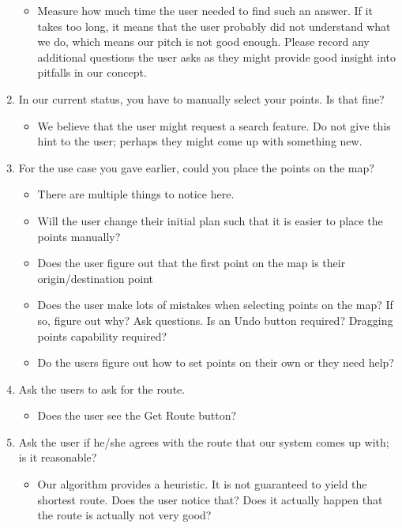 \documentclass[a4paper, 10pt]{report}
\begin{document}
\begin{appendices}
\begin{enumerate}
\begin{itemize}
\item Measure how much time the user needed to find such an answer. If it takes too long, it means that the user probably did not understand what we do, which means our pitch is not good enough. Please record any additional questions the user asks as they might provide good insight into pitfalls in our concept.
\end{itemize}
\item In our current status, you have to manually select your points. Is that fine?
\begin{itemize}
\item We believe that the user might request a search feature. Do not give this hint to the user; perhaps they might come up with something new.
\end{itemize}
\item For the use case you gave earlier, could you place the points on the map?
\begin{itemize}
\item There are multiple things to notice here.
\item Will the user change their initial plan such that it is easier to place the points manually? 
\item Does the user figure out that the first point on the map is their origin/destination point
\item Does the user make lots of mistakes when selecting points on the map? If so, figure out why? Ask questions. Is an Undo button required? Dragging points capability required?
\item Do the users figure out how to set points on their own or they need help?
\end{itemize}
\item Ask the users to ask for the route.
\begin{itemize}
\item Does the user see the Get Route button?
\end{itemize}
\item Ask the user if he/she agrees with the route that our system comes up with; is it reasonable?
\begin{itemize}
\item Our algorithm provides a heuristic. It is not guaranteed to yield the shortest route. Does the user notice that? Does it actually happen that the route is actually not very good?
\end{itemize}
\end{enumerate}


\end{appendices}
\end{document}
